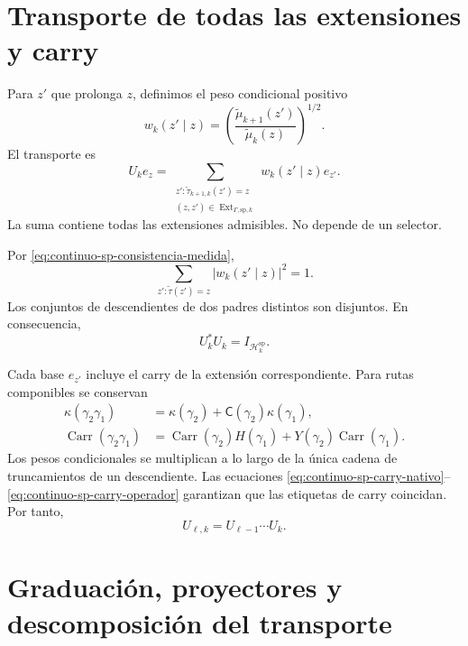 \section{Transporte de todas las extensiones y carry}

Para \(z'\) que prolonga \(z\), definimos el peso condicional positivo
\begin{equation}
\label{eq:continuo-sp-peso-condicional}
 w_k(z'\mid z)
 =\left(\frac{\widetilde\mu_{k+1}(z')}
               {\widetilde\mu_k(z)}\right)^{1/2}.
\end{equation}
El transporte es
\begin{equation}
\label{eq:continuo-sp-u-accion}
 U_ke_z
 =\sum_{\substack{z':\widetilde\tau_{k+1,k}(z')=z\\
            (z,z')\in\operatorname{Ext}_{\Gamma,\mathrm{sp},k}}}
 w_k(z'\mid z)e_{z'}.
\end{equation}
La suma contiene todas las extensiones admisibles. No depende de un selector.

Por \eqref{eq:continuo-sp-consistencia-medida},
\[
 \sum_{z':\widetilde\tau(z')=z}|w_k(z'\mid z)|^2=1.
\]
Los conjuntos de descendientes de dos padres distintos son disjuntos. En
consecuencia,
\begin{equation}
\label{eq:continuo-sp-u-isometria}
 U_k^*U_k=I_{\mathcal H_k^{\mathrm{sp}}}.
\end{equation}

Cada base \(e_{z'}\) incluye el carry de la extensión correspondiente. Para
rutas componibles se conservan
\begin{align}
 \kappa(\gamma_2\gamma_1)
 &=\kappa(\gamma_2)+
   \mathsf C(\gamma_2)\kappa(\gamma_1),
 \label{eq:continuo-sp-carry-nativo}\\
 \operatorname{Carr}(\gamma_2\gamma_1)
 &=\operatorname{Carr}(\gamma_2)H(\gamma_1)
  +Y(\gamma_2)\operatorname{Carr}(\gamma_1).
 \label{eq:continuo-sp-carry-operador}
\end{align}
Los pesos condicionales se multiplican a lo largo de la única cadena de
truncamientos de un descendiente. Las ecuaciones
\eqref{eq:continuo-sp-carry-nativo}--
\eqref{eq:continuo-sp-carry-operador} garantizan que las etiquetas de carry
coincidan. Por tanto,
\begin{equation}
\label{eq:continuo-sp-u-composicion}
 U_{\ell,k}=U_{\ell-1}\cdots U_k.
\end{equation}

\section{Graduación, proyectores y descomposición del transporte}

